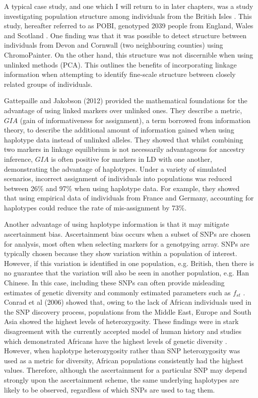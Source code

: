 A typical case study, and one which I will return to in later chapters, was a study investigating population structure among individuals from the British Isles \cite{Leslie2015}. This study, hereafter referred to as POBI, genotyped 2039 people from England, Wales and Scotland \cite{Leslie2015}. One finding was that it was possible to detect structure between individuals from Devon and Cornwall (two neighbouring counties) using ChromoPainter. On the other hand, this structure was not discernible when using unlinked methods (PCA). This outlines the benefits of incorporating linkage information when attempting to identify fine-scale structure between closely related groups of individuals.

Gattepaille and Jakobson (2012) \cite{JakobssonCombiningMarkers} provided the mathematical foundations for the advantage of using linked markers over unlinked ones. They describe a metric, $GIA$ (gain of informativeness for assignment), a term borrowed from information theory, to describe the additional amount of information gained when using haplotype data instead of unlinked alleles. They showed that whilst combining two markers in linkage equilibrium is not necessarily advantageous for ancestry inference, $GIA$ is often positive for markers in LD with one another, demonstrating the advantage of haplotypes. Under a variety of simulated scenarios, incorrect assignment of individuals into populations was reduced between 26\% and 97\% when using haplotype data. For example, they showed that using empirical data of individuals from France and Germany, accounting for haplotypes could reduce the rate of mis-assignment by 73\%. 

Another advantage of using haplotype information is that it may mitigate ascertainment bias. Ascertainment bias occurs when a subset of SNPs are chosen for analysis, most often when selecting markers for a genotpying array. SNPs are typically chosen because they show variation within a population of interest. However, if this variation is identified in one population, e.g. British, then there is no guarantee that the variation will also be seen in another population, e.g. Han Chinese. In this case, including these SNPs can often provide misleading estimates of genetic diversity and commonly estimated parameters such as $f_{st}$ \cite{BergstromHGDP}. Conrad et al (2006) showed that, owing to the lack of African individuals used in the SNP discovery process, populations from the Middle East, Europe and South Asia showed the highest levels of heterozygosity. These findings were in stark disagreement with the currently accepted model of human history and studies which demonstrated Africans have the highest levels of genetic diversity \cite{cann1987mitochondrial, rosenberg2002genetic, ramachandran2005support, bowcock1994high, hellenthal2008inferring}. However, when haplotype heterozygosity rather than SNP heterozygosity was used as a metric for diversity, African populations consistently had the highest values. Therefore, although the ascertainment for a particular SNP may depend strongly upon the ascertainment scheme, the same underlying haplotypes are likely to be observed, regardless of which SNPs are used to tag them. 

